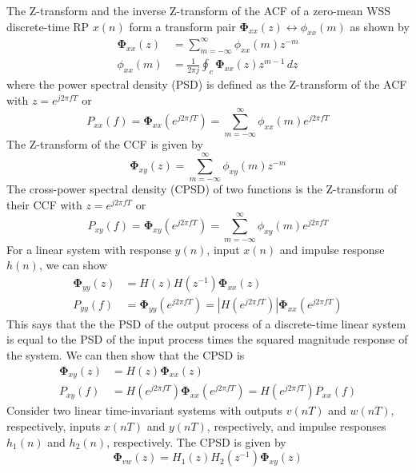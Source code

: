 \documentclass[11pt]{book}
\theoremstyle{example}
\begin{document}
The Z-transform and the inverse Z-transform of the ACF of a zero-mean WSS discrete-time RP $x(n)$ form a transform pair $\mathbf{\Phi}_{xx}(z)\leftrightarrow\phi_{xx}(m)$ as shown by
\begin{align}
	\mathbf{\Phi}_{xx}(z)&=\sum_{m=-\infty}^{\infty}{\phi_{xx}(m)z^{-m}}\\
	\phi_{xx}(m)&=\frac{1}{2{\pi}j}\oint_c{\mathbf{\Phi}_{xx}(z)z^{m-1}\,dz}
\end{align}
where the power spectral density (PSD) is defined as the Z-transform of the ACF with $z=e^{j2{\pi}fT}$ or
\begin{equation}
	P_{xx}(f)=\mathbf{\Phi}_{xx}(e^{j2{\pi}fT})=\sum_{m=-\infty}^{\infty}{\phi_{xx}(m)e^{j2{\pi}fT}}
\end{equation}
The Z-transform of the CCF is given by
\begin{equation}
	\mathbf{\Phi}_{xy}(z)=\sum_{m=-\infty}^{\infty}{\phi_{xy}(m)z^{-m}}
\end{equation}
The cross-power spectral density (CPSD) of two functions is the Z-transform of their CCF with $z=e^{j2{\pi}fT}$ or
\begin{equation}
	P_{xy}(f)=\mathbf{\Phi}_{xy}(e^{j2{\pi}fT})=\sum_{m=-\infty}^{\infty}{\phi_{xy}(m)e^{j2{\pi}fT}}
\end{equation}
For a linear system with response $y(n)$, input $x(n)$ and impulse response $h(n)$, we can show
\begin{align}
	\mathbf{\Phi}_{yy}(z)&=H(z)H(z^{-1})\mathbf{\Phi}_{xx}(z)\\
	P_{yy}(f)&=\mathbf{\Phi}_{yy}(e^{j2{\pi}fT})=|H(e^{j2{\pi}fT})|\mathbf{\Phi}_{xx}(e^{j2{\pi}fT})
\end{align}
This says that the the PSD of the output process of a discrete-time linear system is equal to the PSD of the input process times the squared magnitude response of the system. We can then show that the CPSD is
\begin{align}
	\mathbf{\Phi}_{xy}(z)&=H(z)\mathbf{\Phi}_{xx}(z)\\
	P_{xy}(f)&=H(e^{j2{\pi}fT})\mathbf{\Phi}_{xx}(e^{j2{\pi}fT})=H(e^{j2{\pi}fT})P_{xx}(f)
\end{align}
Consider two linear time-invariant systems with outputs $v(nT)$ and $w(nT)$, respectively, inputs $x(nT)$ and $y(nT)$, respectively, and impulse responses $h_1(n)$ and $h_2(n)$, respectively. The CPSD is given by
\begin{equation}
	\mathbf{\Phi}_{vw}(z)=H_1(z)H_2(z^{-1})\mathbf{\Phi}_{xy}(z)
\end{equation}
\end{document}
